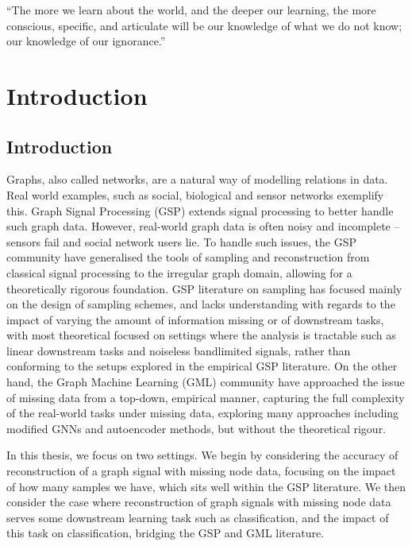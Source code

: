 \begin{savequote}[8cm]
``The more we learn about the world, and the deeper our learning, the more conscious, specific, and articulate will be our knowledge of what we do not know; our knowledge of our ignorance.''
\end{savequote}
\chapter{\label{ch:1-intro}Introduction} 

\section{Introduction}
Graphs, also called networks, are a natural way of modelling relations in data. Real world examples, such as social, biological and sensor networks exemplify this. Graph Signal Processing (GSP) extends signal processing to better handle such graph data. However, real-world graph data is often noisy and incomplete -- sensors fail and social network users lie. To handle such issues, the GSP community have generalised the tools of sampling and reconstruction from classical signal processing to the irregular graph domain, allowing for a theoretically rigorous foundation. GSP literature on sampling has focused mainly on the design of sampling schemes, and lacks understanding with regards to the impact of varying the amount of information missing or of downstream tasks, with most theoretical focused on settings where the analysis is tractable such as linear downstream tasks and noiseless bandlimited signals, rather than conforming to the setups explored in the empirical GSP literature.
On the other hand, the Graph Machine Learning (GML) community have approached the issue of missing data from a top-down, empirical manner, capturing the full complexity of the real-world tasks under missing data, exploring many approaches including modified GNNs and autoencoder methods, but without the theoretical rigour.

In this thesis, we focus on two settings. We begin by considering the accuracy of reconstruction of a graph signal with missing node data, focusing on the impact of how many samples we have, which sits well within the GSP literature. We then consider the case where reconstruction of graph signals with missing node data serves some downstream learning task such as classification, and the impact of this task on classification, bridging the GSP and GML literature.

